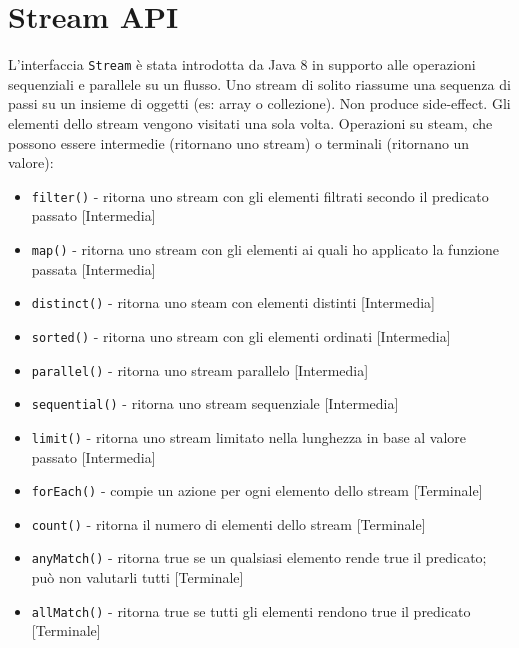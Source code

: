 \section{Stream API}
L'interfaccia \texttt{Stream} è stata introdotta da Java 8 in supporto alle operazioni sequenziali e parallele su un flusso. Uno stream di solito riassume una sequenza di passi su un insieme di oggetti (es: array o collezione). Non produce side-effect. Gli elementi dello stream vengono visitati una sola volta. Operazioni su steam, che possono essere intermedie (ritornano uno stream) o terminali (ritornano un valore):
\begin{itemize}
\item \texttt{filter()} - ritorna uno stream con gli elementi filtrati secondo il predicato passato [Intermedia]
\item \texttt{map()} - ritorna uno stream con gli elementi ai quali ho applicato la funzione passata [Intermedia]
\item \texttt{distinct()} - ritorna uno steam con elementi distinti [Intermedia]
\item \texttt{sorted()} - ritorna uno stream con gli elementi ordinati [Intermedia]
\item \texttt{parallel()} - ritorna uno stream parallelo [Intermedia]
\item \texttt{sequential()} - ritorna uno stream sequenziale [Intermedia]
\item \texttt{limit()} - ritorna uno stream limitato nella lunghezza in base al valore passato [Intermedia]
\item \texttt{forEach()} - compie un azione per ogni elemento dello stream [Terminale]
\item \texttt{count()} - ritorna il numero di elementi dello stream [Terminale]
\item \texttt{anyMatch()} - ritorna true se un qualsiasi elemento rende true il predicato; può non valutarli tutti [Terminale]
\item \texttt{allMatch()} - ritorna true se tutti gli elementi rendono true il predicato [Terminale]
\end{itemize}
